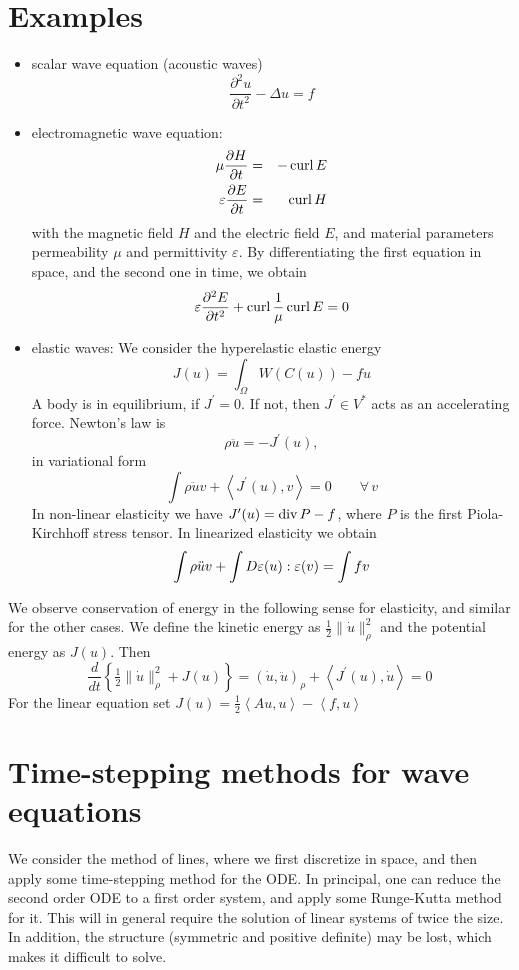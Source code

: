 \section{Examples}
\begin{itemize}
\item scalar wave equation (acoustic waves)
$$
\frac{\partial^2 u}{\partial t^2} - \Delta u = f
$$
\item electromagnetic wave equation: 
\begin{eqnarray*}
\mu \frac{\partial H}{\partial t} & = & -\operatorname{curl} E \\
\varepsilon \frac{\partial E}{\partial t} & = & \operatorname{curl} H
\end{eqnarray*}
with the magnetic field $H$ and the electric field $E$, and material parameters permeability $\mu$ and permittivity $\varepsilon$. By differentiating the first equation in space, and the second one in time, we obtain
$$
\varepsilon \frac{\partial^2 E}{\partial t^2} + \operatorname{curl} \frac{1}{\mu} \operatorname{curl} E = 0
$$
\item elastic waves: We consider the hyperelastic elastic energy
$$
J(u) = \int_\Omega W(C(u)) - f u 
$$
A body is in equilibrium, if $J^\prime = 0$. If not, then $J^\prime \in V^\ast$ acts as an accelerating force. Newton's law is
$$
\rho \ddot u = - J^\prime (u),
$$
in variational form
$$
\int \rho \ddot u v + \left< J^\prime(u), v \right> = 0 \qquad  \forall \, v
$$
In non-linear elasticity we have $J^\prime(u) = \operatorname{div} P - f$, where $P$ is the first Piola-Kirchhoff stress tensor. In linearized elasticity we obtain
$$
\int \rho \ddot u v + \int D \varepsilon(u) : \varepsilon(v) = \int f v 
$$
\end{itemize}

We observe conservation of energy in the following sense for elasticity, and similar for the other cases. We define
the kinetic energy as $\tfrac{1}{2} \| \dot u \|_\rho^2$ and the potential energy as $J(u)$. Then
$$
\frac{d}{dt} \left\{   \tfrac{1}{2} \| \dot u \|_\rho^2 + J(u) \right\} = (\dot u, \ddot u)_\rho + \left< J^\prime(u), \dot u\right> = 0
$$
For the linear equation set $J(u) = \tfrac{1}{2} \left< A u, u \right> - \left< f , u \right>$

\section{Time-stepping methods for wave equations}

We consider the method of lines, where we first discretize in space, and then apply some time-stepping method for the ODE.
In principal, one can reduce the second order ODE to a first order system, and apply some Runge-Kutta method for it. This will in general require the solution of linear systems of twice the size. In addition, the structure (symmetric and positive definite) may be lost, which makes it difficult to solve.  


